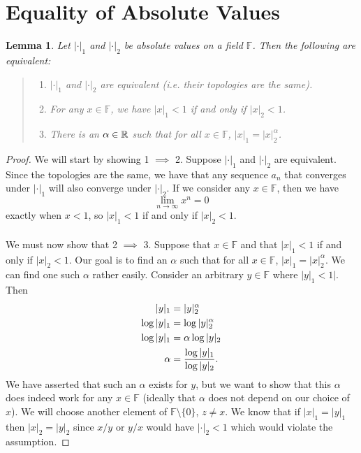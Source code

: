 \documentclass{hw}
\newcommand{\FF}{\mathbb{F}}
\newtheorem{theorem}{Lemma}
\begin{document}
\section*{Equality of Absolute Values}

\begin{theorem}
	Let $|\cdot|_{1}$ and $|\cdot|_{2}$ be absolute values on a field $\FF$. Then the following are
    equivalent:
	\begin{quote}
		\begin{enumerate}
			\item $|\cdot|_{1}$ and $|\cdot|_{2}$ are equivalent (i.e. their topologies are the same).
			\item For any $x\in\FF$, we have $|x|_{1}<1$ if and only if $|x|_{2} < 1$.
			\item There is an $\alpha\in\mathbb{R}$ such that for all $x\in\FF$, $|x|_{1} = |x|_{2}^{\alpha}$.
		\end{enumerate}
	\end{quote}
\end{theorem}

\begin{proof}
    We will start by showing 1 $\implies$ 2. Suppose $|\cdot|_{1}$ and $|\cdot|_{2}$ are equivalent. Since the topologies are the same, we have that any sequence $a_{n}$ that converges under $|\cdot|_{1}$ will also converge under $|\cdot|_{2}$. If we consider any $x\in\FF$, then we have
    \[
        \lim_{n\to\infty}x^{n}=0
    \]
    exactly when $x<1$, so $|x|_{1}<1$ if and only if $|x|_{2} < 1$.\\\\

    We must now show that 2 $\implies$ 3. Suppose that $x\in\FF$ and that $|x|_{1}<1$ if and only if $|x|_{2} < 1$. Our goal is to find an $\alpha$ such that for all $x\in\FF$, $|x|_{1} = |x|_{2}^{\alpha}$. We can find one such $\alpha$ rather easily. Consider an arbitrary $y\in\FF$ where $|y|_{1}<1|$. Then
    \begin{align*}
        |y|_{1} &= |y|_{2}^{\alpha}\\
        \log{|y|_{1}} &= \log{|y|_{2}^{\alpha}}\\
        \log{|y|_{1}} &= \alpha\log{|y|_{2}}\\
        \alpha &= { \log{|y|_{1}} \over \log{|y|_{2}} }.
    \end{align*}
    We have asserted that such an $\alpha$ exists for $y$, but we want to show that this $\alpha$ does indeed work for any $x\in\FF$ (ideally that $\alpha$ does not depend on our choice of $x$).
    We will choose another element of $\FF\setminus\{0\}$, $z\neq x$. We know that if $|x|_{1}=|y|_{1}$ then $|x|_{2}=|y|_{2}$ since $x/y$ or $y/x$ would have $|\cdot|_{2} < 1$ which would violate the assumption.
\end{proof}


\end{document}
